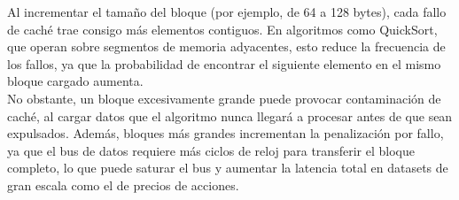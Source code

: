 \documentclass[12pt, a4paper]{article}
\begin{document}
	Al incrementar el tamaño del bloque (por ejemplo, de 64 a 128 bytes), cada fallo de caché trae consigo más elementos contiguos. En algoritmos como QuickSort, que operan sobre segmentos de memoria adyacentes, esto reduce la frecuencia de los fallos, ya que la probabilidad de encontrar el siguiente elemento en el mismo bloque cargado aumenta.\\
	
	No obstante, un bloque excesivamente grande puede provocar contaminación de caché, al cargar datos que el algoritmo nunca llegará a procesar antes de que sean expulsados. Además, bloques más grandes incrementan la penalización por fallo, ya que el bus de datos requiere más ciclos de reloj para transferir el bloque completo, lo que puede saturar el bus y aumentar la latencia total en datasets de gran escala como el de precios de acciones.
	
	
\end{document}

